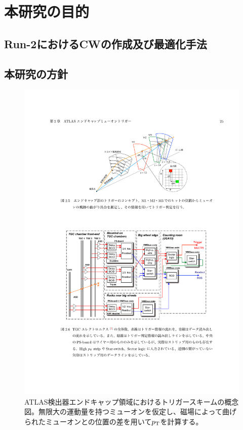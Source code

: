 \section{本研究の目的}
\subsection{Run-2におけるCWの作成及び最適化手法}
\subsection{本研究の方針}


\begin{figure}[tb]
  \centering
  \includegraphics[clip, width=14cm]{fig/3/akatsuka_mt_trigger_scheme.pdf}
  \caption{ATLAS検出器エンドキャップ領域におけるトリガースキームの概念図\cite{article:akatsuka-mron}。無限大の運動量を持つミューオンを仮定し、磁場によって曲げられたミューオンとの位置の差を用いて$p_\mathrm{T}$を計算する。}
  \label{fig:trigger-scheme}
\end{figure}









